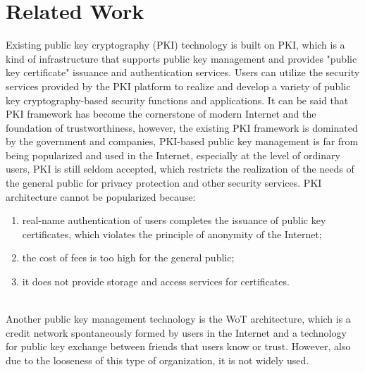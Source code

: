 \section{Related Work}
Existing public key cryptography (PKI) technology is built on PKI, which is a kind of 
infrastructure that supports public key management and provides "public key certificate" 
issuance and authentication services\cite{b5}. Users can utilize the security services provided 
by the PKI platform to realize and develop a variety of public key cryptography-based 
security functions and applications\cite{b6}. It can be said that PKI framework has become the 
cornerstone of modern Internet and the foundation of trustworthiness, however, the 
existing PKI framework is dominated by the government and companies, PKI-based public 
key management is far from being popularized and used in the Internet, especially at 
the level of ordinary users, PKI is still seldom accepted, which restricts the realization 
of the needs of the general public for privacy protection and other security services\cite{b4}. 
PKI architecture cannot be popularized because\cite{b2}: 
\begin{enumerate}[]
    \item real-name authentication of users completes the issuance of public key certificates, which violates the principle of anonymity of the Internet; 
    \item the cost of fees is too high for the general public;
    \item it does not provide storage and access services for certificates.
\end{enumerate}
\\
Another public key management technology is the WoT architecture, which is a credit 
network spontaneously formed by users in the Internet and a technology for public key 
exchange between friends that users know or trust\cite{b4}. However, also due to the looseness 
of this type of organization, it is not widely used\cite{b3}.




